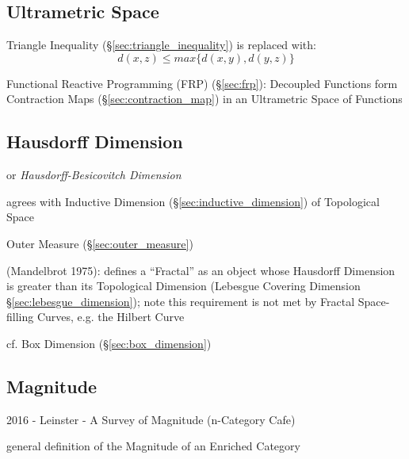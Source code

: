 \subsection{Ultrametric Space}\label{sec:ultrametric_space}

Triangle Inequality (\S\ref{sec:triangle_inequality}) is replaced
with:
\[
  d(x,z) \leq max\{d(x,y),d(y,z)\}
\]

Functional Reactive Programming (FRP) (\S\ref{sec:frp}): Decoupled
Functions form Contraction Maps (\S\ref{sec:contraction_map}) in an
Ultrametric Space of Functions



\subsection{Hausdorff Dimension}\label{sec:hausdorff_dimension}

or \emph{Hausdorff-Besicovitch Dimension}

agrees with Inductive Dimension (\S\ref{sec:inductive_dimension}) of Topological
Space

Outer Measure (\S\ref{sec:outer_measure})

(Mandelbrot 1975): defines a ``Fractal'' as an object whose Hausdorff Dimension
is greater than its Topological Dimension (Lebesgue Covering Dimension
\S\ref{sec:lebesgue_dimension}); note this requirement is not met by Fractal
Space-filling Curves, e.g. the Hilbert Curve

cf. Box Dimension (\S\ref{sec:box_dimension})



\subsection{Magnitude}\label{sec:magnitude}

2016 - Leinster - A Survey of Magnitude (n-Category Cafe) %

general definition of the Magnitude of an Enriched Category %

